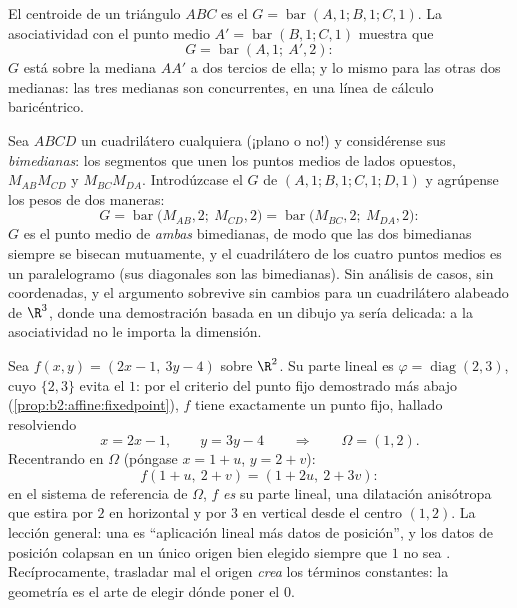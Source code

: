 \begin{example}\label{ex:b2:affine:median}
El centroide de un triángulo $ABC$ es el  $G =
\operatorname{bar}(A,1; B,1; C,1)$. La asociatividad con el punto
medio $A' = \operatorname{bar}(B, 1; C, 1)$ muestra que
\[
G = \operatorname{bar}(A, 1;\ A', 2) :
\]
$G$ está sobre la mediana $AA'$ a dos tercios de ella; y lo mismo
para las otras dos medianas: las tres medianas son concurrentes, en
una línea de cálculo baricéntrico.
\end{example}

\begin{example}\label{ex:b2:affine:bimedians}
Sea $ABCD$ un cuadrilátero cualquiera (¡plano o no!) y considérense
sus \emph{bimedianas}: los segmentos que unen los puntos medios de
lados opuestos, $M_{AB}M_{CD}$ y $M_{BC}M_{DA}$. Introdúzcase el
 $G$ de $(A,1; B,1; C,1; D,1)$ y agrúpense los pesos de
dos maneras:
\[
G = \operatorname{bar}\bigl(M_{AB}, 2;\ M_{CD}, 2\bigr)
= \operatorname{bar}\bigl(M_{BC}, 2;\ M_{DA}, 2\bigr) :
\]
$G$ es el punto medio de \emph{ambas} bimedianas, de modo que las dos
bimedianas siempre se bisecan mutuamente, y el cuadrilátero de los
cuatro puntos medios es un paralelogramo (sus diagonales son las
bimedianas). Sin análisis de casos, sin coordenadas, y el argumento
sobrevive sin cambios para un cuadrilátero alabeado de $\R^3$, donde
una demostración basada en un dibujo ya sería delicada: a la
asociatividad no le importa la dimensión.
\end{example}

\begin{example}\label{ex:b2:affine:dilation}
Sea $f(x, y) = (2x - 1,\ 3y - 4)$ sobre $\R^2$. Su parte lineal es
$\varphi = \operatorname{diag}(2, 3)$, cuyo  $\{2, 3\}$
evita el $1$: por el criterio del punto fijo demostrado más abajo
(\cref{prop:b2:affine:fixedpoint}), $f$ tiene exactamente un punto
fijo, hallado resolviendo
\[
x = 2x - 1, \qquad y = 3y - 4
\qquad\Longrightarrow\qquad \Omega = (1, 2).
\]
Recentrando en $\Omega$ (póngase $x = 1 + u$, $y = 2 + v$):
\[
f(1 + u,\ 2 + v) = (1 + 2u,\ 2 + 3v) :
\]
en el sistema de referencia de $\Omega$, $f$ \emph{es} su parte
lineal, una dilatación anisótropa que estira por $2$ en horizontal y
por $3$ en vertical desde el centro $(1, 2)$. La lección general: una
 es ``aplicación lineal más datos de posición'', y
los datos de posición colapsan en un único origen bien elegido
siempre que $1$ no sea . Recíprocamente, trasladar mal el
origen \emph{crea} los términos constantes: la geometría  es el
arte de elegir dónde poner el $0$.
\end{example}

